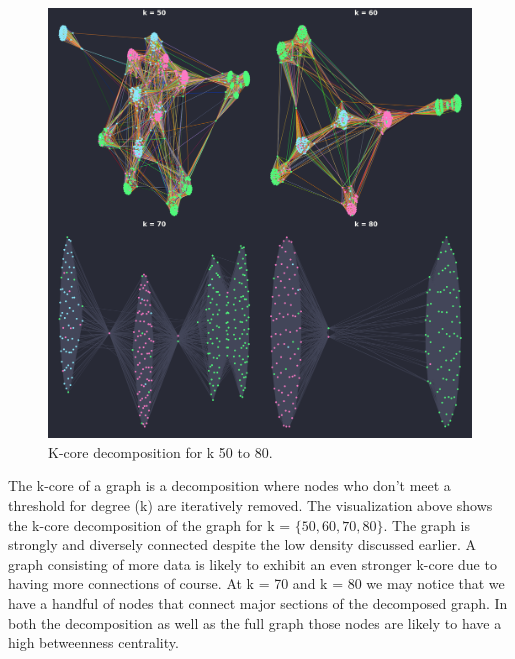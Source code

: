 \documentclass[12pt, a4paper]{article}
\begin{document}
\begin{figure}[ht!]
  \centering
  \includegraphics[width=\textwidth]{network_k_core_50_80.png}
  \caption{K-core decomposition for k 50 to 80.}
  \label{fig:kcore50_80}
\end{figure}

The k-core of a graph is a decomposition where nodes who don't meet a threshold for degree (k) are iteratively removed. The visualization above shows the k-core decomposition of the graph for k = $\{50, 60, 70, 80\}$. The graph is strongly and diversely connected despite the low density discussed earlier. A graph consisting of more data is likely to exhibit an even stronger k-core due to having more connections of course. At k = 70 and k = 80 we may notice that we have a handful of nodes that connect major sections of the decomposed graph. In both the decomposition as well as the full graph those nodes are likely to have a high betweenness centrality.
\end{document}
